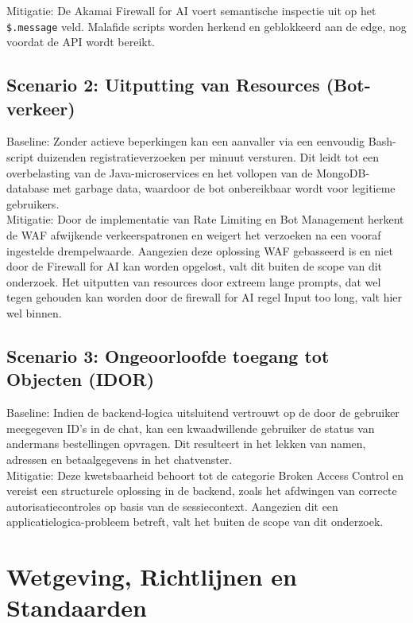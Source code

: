 Mitigatie: De Akamai Firewall for AI voert semantische inspectie uit op het \texttt{\$.message} veld. Malafide scripts worden herkend en geblokkeerd aan de edge, nog voordat de API wordt bereikt.

\subsection{Scenario 2: Uitputting van Resources (Bot-verkeer)}

Baseline: Zonder actieve beperkingen kan een aanvaller via een eenvoudig Bash-script duizenden registratieverzoeken per minuut versturen. Dit leidt tot een overbelasting van de Java-microservices en het vollopen van de MongoDB-database met garbage data, waardoor de bot onbereikbaar wordt voor legitieme gebruikers.\\

Mitigatie: Door de implementatie van Rate Limiting en Bot Management herkent de WAF afwijkende verkeerspatronen en weigert het verzoeken na een vooraf ingestelde drempelwaarde. Aangezien deze oplossing WAF gebasseerd is en niet door de Firewall for AI kan worden opgelost, valt dit buiten de scope van dit onderzoek. Het uitputten van resources door extreem lange prompts, dat wel tegen gehouden kan worden door de firewall for AI regel Input too long, valt hier wel binnen.

\subsection{Scenario 3: Ongeoorloofde toegang tot Objecten (IDOR)}

Baseline: Indien de backend-logica uitsluitend vertrouwt op de door de gebruiker meegegeven ID's in de chat, kan een kwaadwillende gebruiker de status van andermans bestellingen opvragen. Dit resulteert in het lekken van namen, adressen en betaalgegevens in het chatvenster.\\

Mitigatie: Deze kwetsbaarheid behoort tot de categorie Broken Access Control en vereist een structurele oplossing in de backend, zoals het afdwingen van correcte autorisatiecontroles op basis van de sessiecontext. Aangezien dit een applicatielogica-probleem betreft, valt het buiten de scope van dit onderzoek.

\section{Wetgeving, Richtlijnen en Standaarden}

